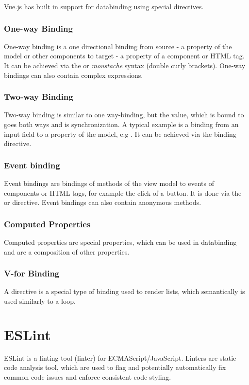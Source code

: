 Vue.js has built in support for \gls{databinding} using special directives.

\subsubsection{One-way Binding}
One-way binding is a one directional binding from source - a property of the model or other components to target - a property of a component or HTML tag. It can be achieved via the  or \textit{moustache} syntax (double curly brackets). One-way bindings can also contain complex expressions.

\subsubsection{Two-way Binding}
Two-way binding is similar to one way-binding, but the value, which is bound to goes both ways and is synchronization. A typical example is a binding from an input field to a property of the model, e.g . It can be achieved via the  binding directive.

\subsubsection{Event binding}
Event bindings are bindings of methods of the view model to events of components or HTML tags, for example the click of a button. It is done via the  or  directive. Event bindings can also contain anonymous methods.

\subsubsection{Computed Properties}
Computed properties are special properties, which can be used in \gls{databinding} and are a composition of other properties.

\subsubsection{V-for Binding}
A  directive is a special type of binding used to render lists, which semantically is used similarly to a  loop.

\section{ESLint}

ESLint \parencite{eslintMainPage} is a linting tool (linter) for ECMAScript/JavaScript. Linters are static code analysis tool, which are  used to flag and potentially automatically fix common code issues and enforce consistent code styling.

